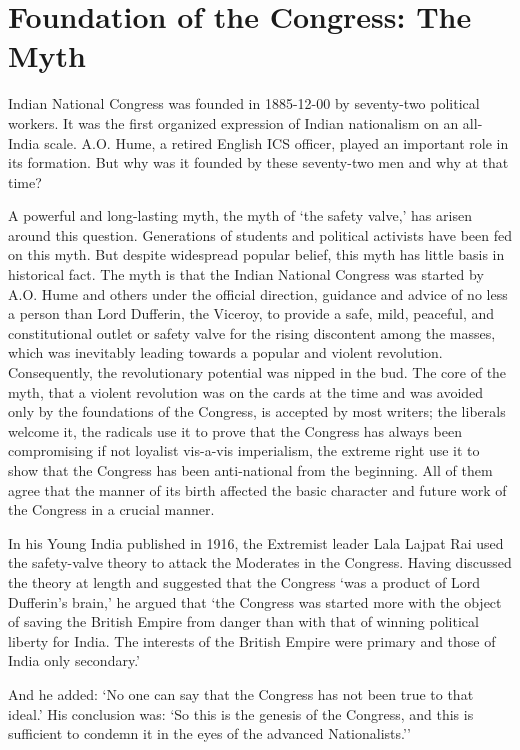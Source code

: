 \chapter{Foundation of the Congress: The Myth}\label{chapter:CH04}
\begin{multicols}{2}

Indian National Congress was founded in 1885-12-00 by seventy-two political workers. It was the first organized expression of Indian nationalism on an all-India scale. A.O. Hume, a retired English ICS officer, played an important role in its formation. But why was it founded by these seventy-two men and why at that time?

A powerful and long-lasting myth, the myth of `the safety valve,' has arisen around this question. Generations of students and political activists have been fed on this myth. But despite widespread popular belief, this myth has little basis in historical fact. The myth is that the Indian National Congress was started by A.O. Hume and others under the official direction, guidance and advice of no less a person than Lord Dufferin, the Viceroy, to provide a safe, mild, peaceful, and constitutional outlet or safety valve for the rising discontent among the masses, which was inevitably leading towards a popular and violent revolution. Consequently, the revolutionary potential was nipped in the bud. The core of the myth, that a violent revolution was on the cards at the time and was avoided only by the foundations of the Congress, is accepted by most writers; the liberals welcome it, the radicals use it to prove that the Congress has always been compromising if not loyalist vis-a-vis imperialism, the extreme right use it to show that the Congress has been anti-national from the beginning. All of them agree that the manner of its birth affected the basic character and future work of the Congress in a crucial manner.

In his Young India published in 1916, the Extremist leader Lala Lajpat Rai used the safety-valve theory to attack the Moderates in the Congress. Having discussed the theory at length and suggested that the Congress `was a product of Lord Dufferin's brain,' he argued that `the Congress was started more with the object of saving the British Empire from danger than with that of winning political liberty for India. The interests of the British Empire were primary and those of India only secondary.'

And he added: `No one can say that the Congress has not been true to that ideal.' His conclusion was: `So this is the genesis of the Congress, and this is sufficient to condemn it in the eyes of the advanced Nationalists.''


\end{multicols}
